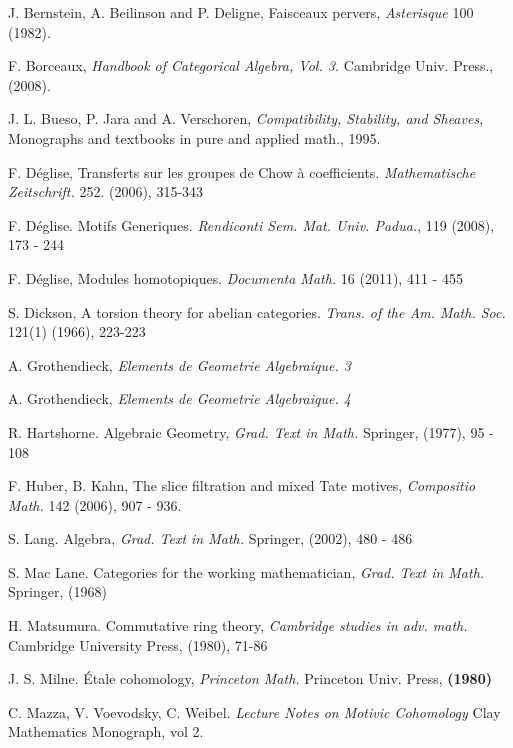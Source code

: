 \newpage

\begin{thebibliography}{10}

J. Bernstein, A. Beilinson and P. Deligne,
Faisceaux pervers, {\em Asterisque} 100 (1982).

F. Borceaux,
{\em Handbook of Categorical Algebra, Vol. 3.}
Cambridge Univ. Press., (2008).

J. L. Bueso, P. Jara and A. Verschoren,
{\em Compatibility, Stability, and Sheaves}, 
Monographs and textbooks in pure and applied math.,
1995.

F. D\'eglise,
Transferts sur les groupes de Chow \`a coefficients.
{\em Mathematische Zeitschrift.} 252. (2006), 315-343

F. D\'eglise.
Motifs Generiques.
\emph{Rendiconti Sem. Mat. Univ. Padua.}, 119 (2008), 173 - 244

F. D\'eglise, 
Modules homotopiques.
{\em Documenta Math.}
16 (2011), 411 - 455

S. Dickson,
A torsion theory for abelian categories.
{\em Trans. of the Am. Math. Soc.} 121(1) (1966), 223-223

A. Grothendieck,
{\em Elements de Geometrie Algebraique. 3}

A. Grothendieck,
{\em Elements de Geometrie Algebraique. 4}

R. Hartshorne.
Algebraic Geometry, {\em Grad. Text in Math.}
Springer, (1977), 95 - 108

F. Huber, B. Kahn, The slice filtration and mixed Tate motives,
{\em Compositio Math.} 142 (2006), 907 - 936.

S. Lang.
Algebra, {\em Grad. Text in Math.}
Springer, (2002), 480 - 486

S. Mac Lane.
Categories for the working mathematician, {\em Grad. Text in Math.}
Springer, (1968)

H. Matsumura.
Commutative ring theory, {\em Cambridge studies in adv. math.}
Cambridge University Press, (1980), 71-86

J. S. Milne.
\'Etale cohomology, {\em Princeton Math.}
Princeton Univ. Press, \textbf{(1980)}

C. Mazza, V. Voevodsky, C. Weibel.
{\em Lecture Notes on Motivic Cohomology}
Clay Mathematics Monograph, vol 2.


\end{thebibliography}
